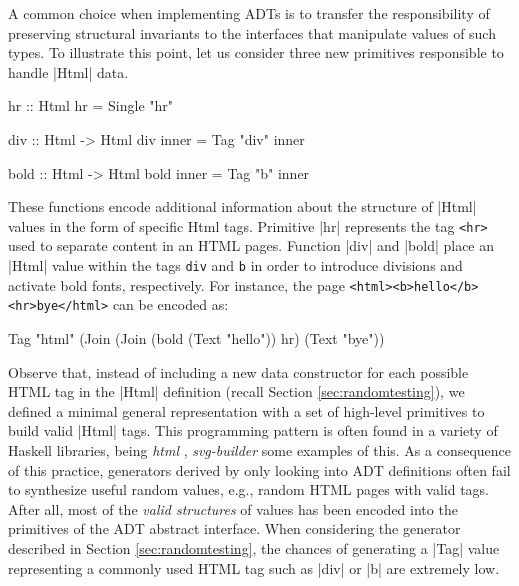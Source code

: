 A common choice when implementing ADTs is to transfer the responsibility of
preserving structural invariants to the interfaces that manipulate values of
such types.
%
To illustrate this point, let us consider three new primitives responsible to
handle |Html| data.
%
\begin{code}
  hr :: Html
  hr = Single "hr"

  div :: Html -> Html
  div inner = Tag "div" inner

  bold :: Html -> Html
  bold inner = Tag "b" inner
\end{code}
%
%
These functions encode additional information about the structure of |Html|
values in the form of specific Html tags.
%
Primitive |hr| represents the tag \texttt{<hr>} used to separate content in an
HTML pages.
%
Function |div| and |bold| place an |Html| value within the tags \texttt{div} and
\texttt{b} in order to introduce divisions and activate bold fonts,
respectively.
%
For instance, the page \texttt{<html><b>hello</b><hr>bye</html>} can be encoded
as:
%
\begin{code}
Tag "html" (Join (Join
  (bold (Text "hello")) hr) (Text "bye"))
\end{code}
%
%
Observe that, instead of including a new data constructor for each possible HTML
tag in the |Html| definition (recall Section \ref{sec:randomtesting}), we
defined a minimal general representation with a set of high-level primitives to
build valid |Html| tags.
%
%
This programming pattern is often
found in a variety of Haskell libraries, being \emph{html} \tocite,
\emph{svg-builder} \tocite some examples of this.
%
As a consequence of this practice, generators derived by only looking into ADT
definitions often fail to synthesize useful random values, e.g., random HTML
pages with valid tags.
%
After all, most of the \emph{valid structures} of values has been encoded into
the primitives of the ADT abstract interface.
%
When considering the generator described in Section \ref{sec:randomtesting}, the
chances of generating a |Tag| value representing a commonly used HTML tag such
as |div| or |b| are extremely low.


